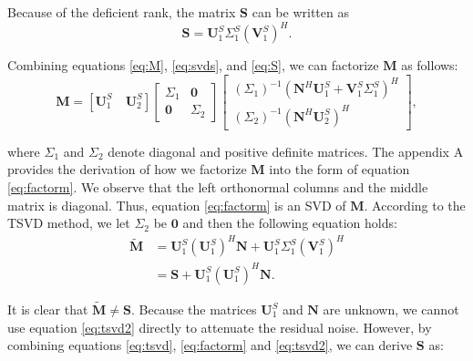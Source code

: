 Because of the deficient rank, the matrix $\mathbf{S}$ can be written as
\begin{equation}
\label{eq:S}
\mathbf{S}=\mathbf{U}_1^S\Sigma_1^S(\mathbf{V}_1^S)^H.
\end{equation}

Combining equations \ref{eq:M}, \ref{eq:svds}, and \ref{eq:S}, we can factorize $\mathbf{M}$ as follows:
\begin{equation}
\label{eq:factorm}
\mathbf{M} = [\mathbf{U}_1^S \quad \mathbf{U}_2^S]\left[\begin{array}{cc} 
\Sigma_{1} & \mathbf{0}\\
\mathbf{0} & \Sigma_{2}
\end{array}
\right]\left[\begin{array}{c} 
(\Sigma_{1})^{-1}(\mathbf{N}^H\mathbf{U}_1^S+\mathbf{V}_1^S\Sigma_1^S)^H\\
(\Sigma_{2})^{-1}(\mathbf{N}^H\mathbf{U}_2^S)^H
\end{array}
\right],
\end{equation} 

where $\Sigma_1$ and $\Sigma_2$ denote diagonal and positive definite matrices.  The appendix A provides the derivation of how we factorize $\mathbf{M}$ into the form of equation \ref{eq:factorm}. We observe that the left   orthonormal columns and the middle matrix is diagonal.  Thus, equation \ref{eq:factorm} is an SVD of $\mathbf{M}$. According to the TSVD method, we let $\Sigma_2$ be $\mathbf{0}$ and then the following equation holds:
\begin{equation}
\label{eq:tsvd2}
\begin{split}
\tilde{\mathbf{M}} &= \mathbf{U}_1^S(\mathbf{U}_1^S)^H\mathbf{N} + \mathbf{U}_1^S\Sigma_1^S(\mathbf{V}_1^S)^H \\
 &=\mathbf{S} + \mathbf{U}_1^S(\mathbf{U}_1^S)^H\mathbf{N}.
\end{split}
\end{equation}

It is clear that $\tilde{\mathbf{M}}\neq\mathbf{S}$. Because the matrices $\mathbf{U}_1^S$ and $\mathbf{N}$ are unknown, we cannot use equation \ref{eq:tsvd2} directly to attenuate the residual noise. However, by combining equations \ref{eq:tsvd}, \ref{eq:factorm} and \ref{eq:tsvd2}, we can derive $\mathbf{S}$ as:

